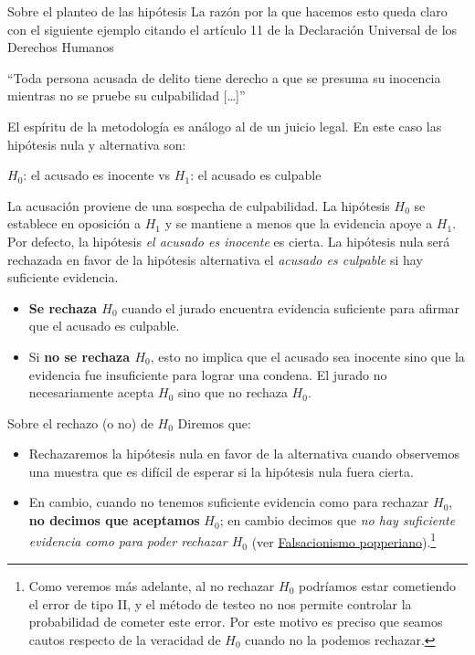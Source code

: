 \documentclass{beamer}
\theoremstyle{definition}
\begin{document}
\begin{frame}{\color{rosee}Sobre el planteo de las hipótesis} \small
La razón por la que hacemos esto queda claro con el siguiente ejemplo citando el art\'iculo 11 de la Declaraci\'on Universal de los Derechos Humanos

``Toda persona acusada de delito tiene derecho a que se presuma su
     inocencia mientras no se pruebe su culpabilidad [\dots]''

  El esp\'iritu de la metodolog\'ia es an\'alogo al de un juicio
  legal. En este caso las hip\'otesis nula y alternativa son:
  \begin{center}
   $H_0$: el acusado es inocente vs $H_1$: el acusado es culpable
  \end{center}
   La acusaci\'on proviene de una sospecha de culpabilidad. La hip\'otesis $H_0$ se establece en oposici\'on a $H_1$ y se mantiene a menos que la evidencia apoye a $H_1$.
  Por defecto, la hip\'otesis \textit{el acusado es inocente} es
  cierta. La hip\'otesis nula ser\'a rechazada en favor de la
  hip\'otesis alternativa el \textit{acusado es culpable} si hay
  suficiente evidencia.
  \begin{itemize}
  \item \textbf{Se rechaza $H_0$} cuando el jurado encuentra evidencia suficiente para afirmar que el acusado es culpable.
  \item Si \textbf{no se rechaza $H_0$}, esto no implica que el acusado sea
    inocente sino que la evidencia fue insuficiente para lograr una condena. El jurado no necesariamente acepta $H_0$ sino que
      no rechaza $H_0$.
  \end{itemize}
\end{frame}

\begin{frame}{\color{rosee}Sobre el rechazo (o no) de $H_0$} 
Diremos que:\medskip
  
\begin{itemize}
    \item Rechazaremos la hip\'otesis nula en favor de la alternativa cuando
    observemos una muestra que es dif\'icil de esperar si la hip\'otesis
    nula fuera cierta.\medskip

    

    \item En cambio, cuando no tenemos suficiente evidencia como para rechazar $H_0$, \textbf{no decimos que aceptamos }$H_0$; en cambio decimos que \textit{no hay suficiente evidencia como para poder rechazar $H_0$} (ver \href{https://es.wikipedia.org/wiki/Falsacionismo}{Falsacionismo popperiano}).\footnote{Como veremos más adelante, al no rechazar $H_0$ podríamos estar cometiendo el error de tipo II, y el método de testeo no nos permite controlar la probabilidad de cometer este error. Por este motivo es preciso que seamos cautos respecto de la veracidad de $H_0$ cuando no la podemos rechazar.}
\end{itemize}
  
\end{frame}
\end{document}
